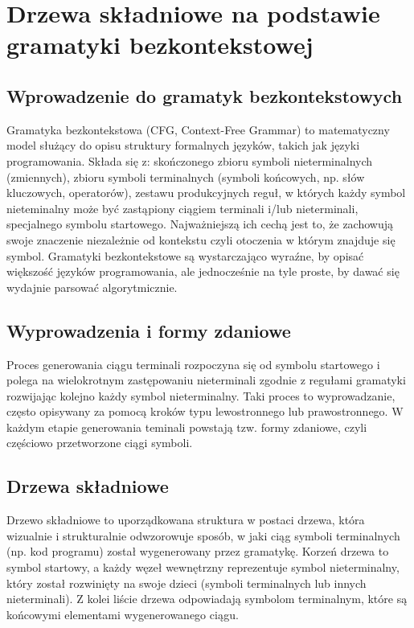 \documentclass[12pt,twoside]{article}
\begin{document}
\clearpage

\section{Drzewa składniowe na podstawie gramatyki bezkontekstowej}
\subsection{Wprowadzenie do gramatyk bezkontekstowych}
Gramatyka bezkontekstowa (CFG, Context-Free Grammar) to matematyczny model służący do opisu struktury formalnych języków, takich jak języki programowania. Składa się z: skończonego zbioru symboli nieterminalnych (zmiennych), zbioru symboli terminalnych (symboli końcowych, np. słów kluczowych, operatorów), zestawu produkcyjnych reguł, w których każdy symbol nieteminalny może być zastąpiony ciągiem terminali i/lub nieterminali, specjalnego symbolu startowego. Najważniejszą ich cechą jest to, że zachowują swoje znaczenie niezależnie od kontekstu czyli otoczenia w którym znajduje się symbol. Gramatyki bezkontekstowe są wystarczająco wyraźne, by opisać większość języków programowania, ale jednocześnie na tyle proste, by dawać się wydajnie parsować algorytmicznie.\cite{contextFreeGrammar}

\subsection{Wyprowadzenia i formy zdaniowe}
Proces generowania ciągu terminali rozpoczyna się od symbolu startowego i polega na wielokrotnym zastępowaniu nieterminali zgodnie z regułami gramatyki rozwijając kolejno każdy symbol nieterminalny\cite{contextFreeGrammar}. Taki proces to wyprowadzanie, często opisywany za pomocą kroków typu lewostronnego lub prawostronnego. W każdym etapie generowania teminali powstają tzw. formy zdaniowe, czyli częściowo przetworzone ciągi symboli.

\subsection{Drzewa składniowe}
Drzewo składniowe to uporządkowana struktura w postaci drzewa, która wizualnie i strukturalnie odwzorowuje sposób, w jaki ciąg symboli terminalnych (np. kod programu) został wygenerowany przez gramatykę. Korzeń drzewa to symbol startowy, a każdy węzeł wewnętrzny reprezentuje symbol nieterminalny, który został rozwinięty na swoje dzieci (symboli terminalnych lub innych nieterminali). Z kolei liście drzewa odpowiadają symbolom terminalnym, które są końcowymi elementami wygenerowanego ciągu.
\end{document}
